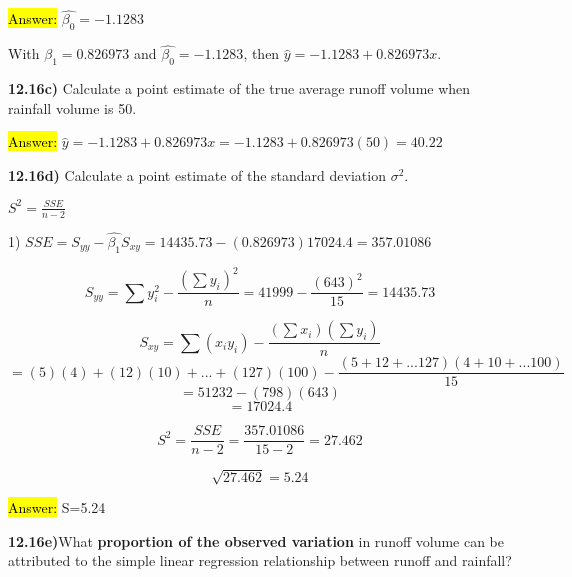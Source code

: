 \documentclass{article}
\begin{document}
\hl{Answer:} $\hat{\beta_{0}}=-1.1283$

\vspace{2mm}


With $\hat{\beta_{1}}=0.826973$ and $\hat{\beta_{0}}=-1.1283$, then $\hat{y}=-1.1283+0.826973x$.



\vspace{5mm}


\textbf{12.16c)} Calculate a point estimate of the true average runoff volume when rainfall volume is 50.

\vspace{2mm}


\hl{Answer:} $\hat{y}=-1.1283+0.826973x=-1.1283+0.826973(50)=40.22$



\vspace{5mm}



\textbf{12.16d)} Calculate a point estimate of the standard deviation $\sigma^{2}$.

\vspace{2mm}

$S^{2}=\frac{SSE}{n-2}$

\vspace{2mm}

1) $SSE=S_{yy}-\hat{\beta_{1}}S_{xy}=14435.73-(0.826973)17024.4=357.01086$

\vspace{2mm}

$$S_{yy}=\sum y_{i}^{2}-\frac{(\sum y_{i})^{2}}{n}=41999-\frac{(643)^{2}}{15}=14435.73$$

\vspace{2mm}


 $$ S_{xy}=\sum (x_{i}y_{i})-\frac{(\sum x_{i})(\sum y_{i})}{n}$$
$$=(5)(4)+(12)(10)+...+(127)(100)-\frac{(5+12+...127)(4+10+...100)}{15}$$
$$=51232-(798)(643)$$
$$=17024.4$$


$$S^{2}=\frac{SSE}{n-2}=\frac{357.01086}{15-2}=27.462$$

$$\sqrt{27.462}=5.24$$


\vspace{2mm}

\hl{Answer:} S=5.24




\vspace{5mm}



\textbf{12.16e)}What \textbf{proportion of the observed variation} in runoff volume can be attributed to the simple linear regression relationship between runoff and rainfall?
\end{document}
